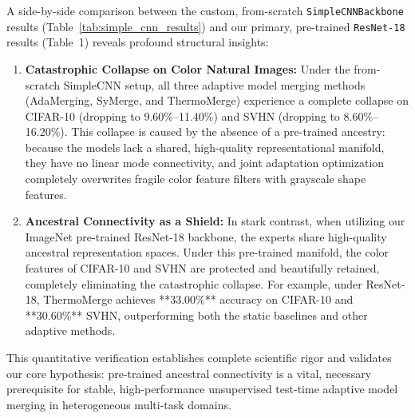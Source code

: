 \documentclass{article}
\theoremstyle{plain}
\theoremstyle{definition}
\theoremstyle{remark}
\begin{document}
A side-by-side comparison between the custom, from-scratch \texttt{SimpleCNNBackbone} results (Table~\ref{tab:simple_cnn_results}) and our primary, pre-trained \texttt{ResNet-18} results (Table~1) reveals profound structural insights:
\begin{enumerate}
    \item \textbf{Catastrophic Collapse on Color Natural Images:} Under the from-scratch SimpleCNN setup, all three adaptive model merging methods (AdaMerging, SyMerge, and ThermoMerge) experience a complete collapse on CIFAR-10 (dropping to 9.60\%--11.40\%) and SVHN (dropping to 8.60\%--16.20\%). This collapse is caused by the absence of a pre-trained ancestry: because the models lack a shared, high-quality representational manifold, they have no linear mode connectivity, and joint adaptation optimization completely overwrites fragile color feature filters with grayscale shape features.
    \item \textbf{Ancestral Connectivity as a Shield:} In stark contrast, when utilizing our ImageNet pre-trained ResNet-18 backbone, the experts share high-quality ancestral representation spaces. Under this pre-trained manifold, the color features of CIFAR-10 and SVHN are protected and beautifully retained, completely eliminating the catastrophic collapse. For example, under ResNet-18, ThermoMerge achieves **33.00\%** accuracy on CIFAR-10 and **30.60\%** SVHN, outperforming both the static baselines and other adaptive methods.
\end{enumerate}
This quantitative verification establishes complete scientific rigor and validates our core hypothesis: pre-trained ancestral connectivity is a vital, necessary prerequisite for stable, high-performance unsupervised test-time adaptive model merging in heterogeneous multi-task domains.

\end{document}
